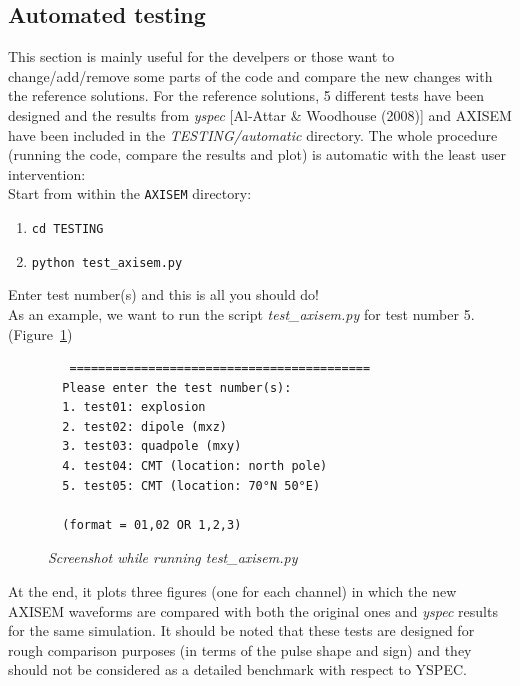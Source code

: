 \subsection{Automated testing}

This section is mainly useful for the develpers or those want to change/add/remove some parts of the code and compare the new changes with the reference solutions.
For the reference solutions, 5 different tests have been designed and 
the results from \textit{yspec} [Al-Attar \& Woodhouse (2008)] and AXISEM have been included in the \textit{TESTING/automatic} directory.
The whole procedure (running the code, compare the results and plot) is automatic with the least user intervention: \\

Start from within the {\tt AXISEM} directory:
 \begin{enumerate}
 \item {\tt cd TESTING}
 \item {\tt python test\_axisem.py}
 \end{enumerate}

Enter test number(s) and this is all you should do! \\

\noindent As an example, we want to run the script \textit{test\_axisem.py} for test number 5. (Figure~\ref{test_axisem})

\begin{figure}[htb]
  \begin{verbatim}
   ==========================================
  Please enter the test number(s): 
  1. test01: explosion
  2. test02: dipole (mxz)
  3. test03: quadpole (mxy)
  4. test04: CMT (location: north pole)
  5. test05: CMT (location: 70°N 50°E)

  (format = 01,02 OR 1,2,3)
  \end{verbatim}
  \caption{\textit{Screenshot while running test\_axisem.py}}
\label{test_axisem}
\end{figure}

\noindent At the end, it plots three figures (one for each channel) 
in which the new AXISEM waveforms are compared with both the original ones and \textit{yspec} results for the same simulation.
It should be noted that these tests are designed for rough comparison purposes (in terms of the pulse shape and sign) and they should not be considered as a detailed benchmark with respect to YSPEC. \\

